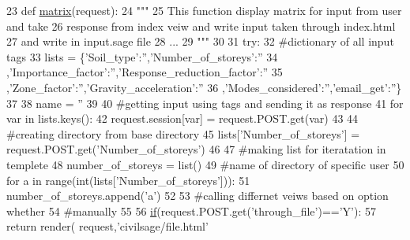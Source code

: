 \begin{DoxyCode}
23 \textcolor{keyword}{def }\hyperlink{namespacecivilsage_1_1views_a8b58c93a9c82e84143c43dafaa744a4b}{matrix}(request):
24     \textcolor{stringliteral}{"""}
25 \textcolor{stringliteral}{    This function display matrix for input from user and take}
26 \textcolor{stringliteral}{    response from index veiw and write input taken through index.html}
27 \textcolor{stringliteral}{    and write in input.sage file}
28 \textcolor{stringliteral}{    ...}
29 \textcolor{stringliteral}{    """}
30 
31     \textcolor{keywordflow}{try}:
32         \textcolor{comment}{#dictionary of all input tags}
33         lists = \{\textcolor{stringliteral}{'Soil\_type'}:\textcolor{stringliteral}{''},\textcolor{stringliteral}{'Number\_of\_storeys'}:\textcolor{stringliteral}{''}
34         ,\textcolor{stringliteral}{'Importance\_factor'}:\textcolor{stringliteral}{''},\textcolor{stringliteral}{'Response\_reduction\_factor'}:\textcolor{stringliteral}{''}
35         ,\textcolor{stringliteral}{'Zone\_factor'}:\textcolor{stringliteral}{''},\textcolor{stringliteral}{'Gravity\_acceleration'}:\textcolor{stringliteral}{''}
36         ,\textcolor{stringliteral}{'Modes\_considered'}:\textcolor{stringliteral}{''},\textcolor{stringliteral}{'email\_get'}:\textcolor{stringliteral}{''}\}
37 
38         name = \textcolor{stringliteral}{''}
39 
40         \textcolor{comment}{#getting input using tags and sending it as response}
41         \textcolor{keywordflow}{for} var \textcolor{keywordflow}{in} lists.keys():
42             request.session[var] = request.POST.get(var)
43 
44         \textcolor{comment}{#creating directory from base directory}
45         lists[\textcolor{stringliteral}{'Number\_of\_storeys'}] = request.POST.get(\textcolor{stringliteral}{'Number\_of\_storeys'})
46 
47         \textcolor{comment}{#making list for iteratation in templete}
48         number\_of\_storeys = list()
49         \textcolor{comment}{#name of directory of specific user}
50         \textcolor{keywordflow}{for} a \textcolor{keywordflow}{in} range(int(lists[\textcolor{stringliteral}{'Number\_of\_storeys'}])):
51             number\_of\_storeys.append(\textcolor{stringliteral}{'a'})
52 
53         \textcolor{comment}{#calling differnet veiws based on option whether}
54         \textcolor{comment}{#manually}
55 
56         \hyperlink{bootstrap_8min_8js_ac2d69f5011896c6ed4a54e0dd36f6334}{if}(request.POST.get(\textcolor{stringliteral}{'through\_file'})==\textcolor{stringliteral}{'Y'}):
57             \textcolor{keywordflow}{return} render( request,\textcolor{stringliteral}{'civilsage/file.html'}

\end{DoxyCode}
